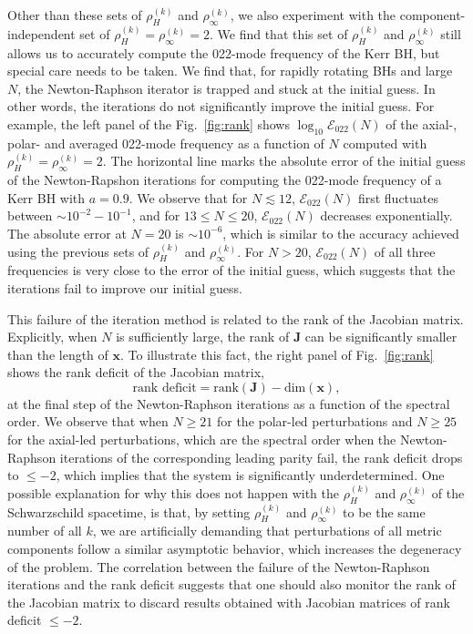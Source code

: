 \documentclass[aps,prx,amsmath,floats,floatfix,twocolumn,
  superscriptaddress,nofootinbib,showpacs]{revtex4-1}
\begin{document}
Other than these sets of $\rho_H^{(k)}$ and $\rho_{\infty}^{(k)}$, we also experiment with the component-independent set of $\rho_{H}^{(k)} = \rho_{\infty}^{(k)} = 2$. 
We find that this set of $\rho_H^{(k)}$ and $\rho_{\infty}^{(k)}$ still allows us to accurately compute the 022-mode frequency of the Kerr BH, but special care needs to be taken. 
We find that, for rapidly rotating BHs and large $N$, the Newton-Raphson iterator is trapped and stuck at the initial guess. 
In other words, the iterations do not significantly improve the initial guess. 
For example, the left panel of the Fig.~\ref{fig:rank} shows $\log_{10} \mathcal{E}_{022}(N)$ of the axial-, polar- and averaged 022-mode frequency as a function of $N$ computed with $\rho_{H}^{(k)} = \rho_{\infty}^{(k)} = 2$. 
The horizontal line marks the absolute error of the initial guess of the Newton-Rapshon iterations for computing the 022-mode frequency of a Kerr BH with $a=0.9$. 
We observe that for $N \lesssim 12$, $\mathcal{E}_{022}(N)$ first fluctuates between $\sim 10^{-2} - 10^{-1} $, and for $13 \leq N \leq 20 $, $\mathcal{E}_{022}(N)$ decreases exponentially. 
The absolute error at $N = 20$ is $\sim 10^{-6}$, which is similar to the accuracy achieved using the previous sets of $\rho_H^{(k)}$ and $\rho_{\infty}^{(k)}$. 
For $N > 20 $, $\mathcal{E}_{022}(N)$ of all three frequencies is very close to the error of the initial guess, which suggests that the iterations fail to improve our initial guess. 

This failure of the iteration method is related to the rank of the Jacobian matrix. 
Explicitly, when $N$ is sufficiently large, the rank of $\textbf{J}$ can be significantly smaller than the length of $\textbf{x}$. 
To illustrate this fact, the right panel of Fig.~\ref{fig:rank} shows the rank deficit of the Jacobian matrix, 
\begin{equation}\label{eq:rank_deficit}
\text{rank deficit} = \text{rank}(\textbf{J}) - \text{dim}({\textbf{x}}), 
\end{equation}
at the final step of the Newton-Raphson iterations as a function of the spectral order. 
We observe that when $N \geq 21 $ for the polar-led perturbations and $N \geq 25$ for the axial-led perturbations, which are the spectral order when the Newton-Raphson iterations of the corresponding leading parity fail, the rank deficit drops to $\leq -2 $, which implies that the system is significantly underdetermined. 
One possible explanation for why this does not happen with the $\rho_{H}^{(k)}$ and $\rho_{\infty}^{(k)}$ of the Schwarzschild spacetime, is that, by setting $\rho_{H}^{(k)}$ and $\rho_{\infty}^{(k)}$ to be the same number of all $k$, we are artificially demanding that perturbations of all metric components follow a similar asymptotic behavior, which increases the degeneracy of the problem. 
The correlation between the failure of the Newton-Raphson iterations and the rank deficit suggests that one should also monitor the rank of the Jacobian matrix to discard results obtained with Jacobian matrices of rank deficit $\leq -2$. 
\end{document}
